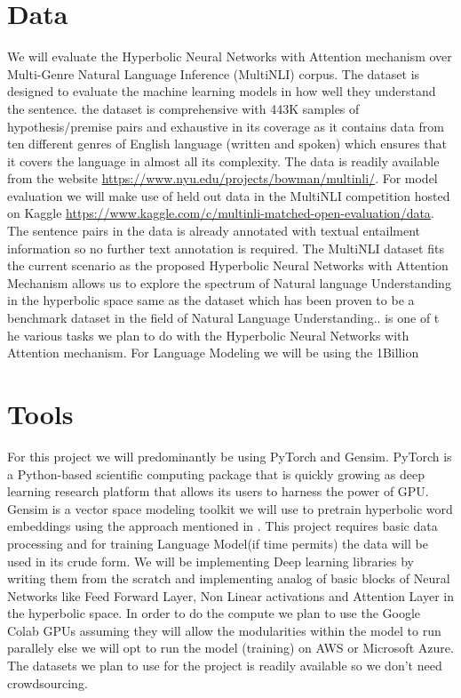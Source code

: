 \documentclass[11pt,a4paper]{article}
\begin{document}
\section{Data}


We will evaluate the Hyperbolic Neural Networks with Attention mechanism over  Multi-Genre Natural Language Inference (MultiNLI) corpus. The dataset is designed to evaluate the machine learning models in how well they understand the sentence. the dataset is comprehensive with 443K samples of hypothesis/premise pairs and exhaustive in its coverage as it contains data from ten different genres of English language (written and spoken) which ensures that it covers the language in almost all its complexity.
The data is readily available from the website \url{https://www.nyu.edu/projects/bowman/multinli/}.
For model evaluation we will make use of held out data in the MultiNLI competition hosted on Kaggle \url{https://www.kaggle.com/c/multinli-matched-open-evaluation/data}.
The sentence pairs in the data is already annotated with textual entailment information so no further text annotation is required. The MultiNLI dataset fits the current scenario as the proposed Hyperbolic Neural Networks with Attention Mechanism allows us to explore the spectrum of Natural language Understanding in the hyperbolic space same as the dataset which has been proven to be a benchmark dataset in the field of Natural Language Understanding..
is one of t he various tasks we plan to do with the Hyperbolic Neural Networks with Attention mechanism. For Language Modeling we will be using the 1Billion 


\section{Tools}

For this project we will predominantly be using PyTorch and Gensim.
PyTorch is a Python-based scientific computing package that is quickly growing as deep learning research platform that allows its users to harness the power of GPU. Gensim is a vector space modeling toolkit we will use to pretrain hyperbolic word embeddings using the approach mentioned in . This project requires basic data processing and for training Language Model(if time permits) the data will be used in its crude form. We will be implementing Deep learning libraries by writing them from the scratch and implementing analog of basic blocks of Neural Networks like Feed Forward Layer, Non Linear activations and Attention Layer in the hyperbolic space. In order to do the compute we plan to use the Google Colab GPUs assuming they will allow the modularities within the model to run parallely else we will opt to run the model (training) on AWS or Microsoft Azure. The datasets we plan to use for the project is readily available so we don't need crowdsourcing.



\footnotesize

\end{document}
